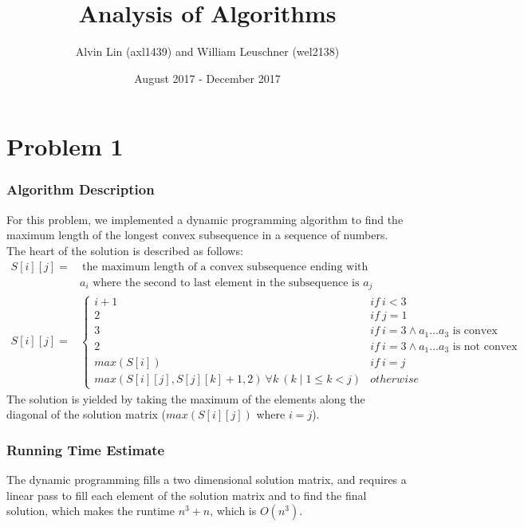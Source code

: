 \documentclass{math}
\title{Analysis of Algorithms}
\author{Alvin Lin (axl1439) and William Leuschner (wel2138)}
\date{August 2017 - December 2017}
\begin{document}
\maketitle

\section*{Problem 1}

\subsubsection*{Algorithm Description}
For this problem, we implemented a dynamic programming algorithm to find the
maximum length of the longest convex subsequence in a sequence of numbers. The
heart of the solution is described as follows:
\begin{align*}
  S[i][j] =& ~\text{the maximum length of a convex subsequence ending with} \\
  & a_i \text{ where the second to last element in the subsequence is } a_j \\
  S[i][j] =& \begin{cases}
    i + 1 & if~ i < 3 \\
    2 & if~ j = 1 \\
    3 & if~ i = 3 \wedge a_1\dots a_3 \text{ is convex} \\
    2 & if~ i = 3 \wedge a_1\dots a_3 \text{ is not convex} \\
    max(S[i]) & if~ i = j \\
    max(S[i][j], S[j][k] + 1, 2)~\forall k~(k\mid 1\le k<j) & otherwise
  \end{cases}
\end{align*}
The solution is yielded by taking the maximum of the elements along the diagonal
of the solution matrix (\( max(S[i][j]) \) where \( i = j \)).

\subsubsection*{Running Time Estimate}
The dynamic programming fills a two dimensional solution matrix, and requires
a linear pass to fill each element of the solution matrix and to find the final
solution, which makes the runtime \( n^3+n \), which is \( O(n^3) \).
\end{document}
